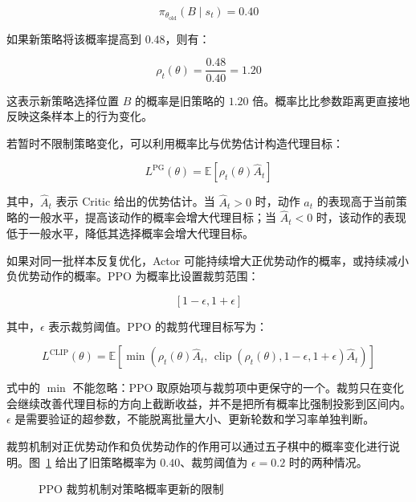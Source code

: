 \documentclass[UTF8,a4paper,zihao=-4,oneside,openany]{ctexbook}
\begin{document}
\[
\pi_{\theta_{\mathrm{old}}}(B\mid s_t)=0.40
\]

如果新策略将该概率提高到 $0.48$，则有：

\begin{equation}
\rho_t(\theta)
=
\frac{0.48}{0.40}
=
1.20
\end{equation}

这表示新策略选择位置 $B$ 的概率是旧策略的 $1.20$ 倍。概率比比参数距离更直接地反映这条样本上的行为变化。

若暂时不限制策略变化，可以利用概率比与优势估计构造代理目标：

\begin{equation}
L^{\mathrm{PG}}(\theta)
=
\mathbb{E}
\left[
\rho_t(\theta)\widehat{A}_t
\right]
\end{equation}

其中，$\widehat{A}_t$ 表示 Critic 给出的优势估计。当 $\widehat{A}_t>0$ 时，动作 $a_t$ 的表现高于当前策略的一般水平，提高该动作的概率会增大代理目标；当 $\widehat{A}_t<0$ 时，该动作的表现低于一般水平，降低其选择概率会增大代理目标。

如果对同一批样本反复优化，Actor 可能持续增大正优势动作的概率，或持续减小负优势动作的概率。PPO 为概率比设置裁剪范围：

\[
[1-\epsilon,1+\epsilon]
\]

其中，$\epsilon$ 表示裁剪阈值。PPO 的裁剪代理目标写为：

\begin{equation}
L^{\mathrm{CLIP}}(\theta)
=
\mathbb{E}
\left[
\min
\left(
\rho_t(\theta)\widehat{A}_t,\,
\operatorname{clip}
\left(
\rho_t(\theta),
1-\epsilon,
1+\epsilon
\right)
\widehat{A}_t
\right)
\right]
\end{equation}

式中的 $\min$ 不能忽略：PPO 取原始项与裁剪项中更保守的一个。裁剪只在变化会继续改善代理目标的方向上截断收益，并不是把所有概率比强制投影到区间内。$\epsilon$ 是需要验证的超参数，不能脱离批量大小、更新轮数和学习率单独判断。

裁剪机制对正优势动作和负优势动作的作用可以通过五子棋中的概率变化进行说明。图~\ref{fig:ppo_clipping_mechanism} 给出了旧策略概率为 $0.40$、裁剪阈值为 $\epsilon=0.2$ 时的两种情况。

\begin{figure}[htbp]
  \centering
  \caption{PPO 裁剪机制对策略概率更新的限制}
  \label{fig:ppo_clipping_mechanism}
\end{figure}
\end{document}

